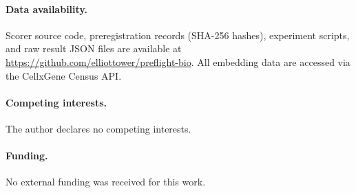 \documentclass[9pt,lineno]{elife}
\begin{document}
\paragraph{Data availability.} Scorer source code, preregistration records (SHA-256 hashes), experiment scripts, and raw result JSON files are available at \url{https://github.com/elliottower/preflight-bio}. All embedding data are accessed via the CellxGene Census API.

\paragraph{Competing interests.} The author declares no competing interests.

\paragraph{Funding.} No external funding was received for this work.


\end{document}
